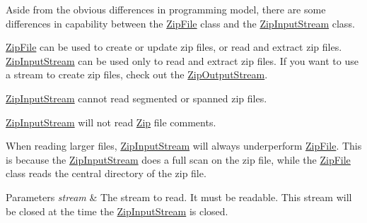 Aside from the obvious differences in programming model, there are some differences in capability between the {\ttfamily \mbox{\hyperlink{class_super_tiled2_unity_1_1_ionic_1_1_zip_1_1_zip_file}{Zip\+File}}} class and the {\ttfamily \mbox{\hyperlink{class_super_tiled2_unity_1_1_ionic_1_1_zip_1_1_zip_input_stream}{Zip\+Input\+Stream}}} class. 


\begin{DoxyItemize}
\item {\ttfamily \mbox{\hyperlink{class_super_tiled2_unity_1_1_ionic_1_1_zip_1_1_zip_file}{Zip\+File}}} can be used to create or update zip files, or read and extract zip files. {\ttfamily \mbox{\hyperlink{class_super_tiled2_unity_1_1_ionic_1_1_zip_1_1_zip_input_stream}{Zip\+Input\+Stream}}} can be used only to read and extract zip files. If you want to use a stream to create zip files, check out the \mbox{\hyperlink{class_super_tiled2_unity_1_1_ionic_1_1_zip_1_1_zip_output_stream}{Zip\+Output\+Stream}}. 


\item {\ttfamily \mbox{\hyperlink{class_super_tiled2_unity_1_1_ionic_1_1_zip_1_1_zip_input_stream}{Zip\+Input\+Stream}}} cannot read segmented or spanned zip files. 


\item {\ttfamily \mbox{\hyperlink{class_super_tiled2_unity_1_1_ionic_1_1_zip_1_1_zip_input_stream}{Zip\+Input\+Stream}}} will not read \mbox{\hyperlink{namespace_super_tiled2_unity_1_1_ionic_1_1_zip}{Zip}} file comments. 


\item When reading larger files, {\ttfamily \mbox{\hyperlink{class_super_tiled2_unity_1_1_ionic_1_1_zip_1_1_zip_input_stream}{Zip\+Input\+Stream}}} will always underperform {\ttfamily \mbox{\hyperlink{class_super_tiled2_unity_1_1_ionic_1_1_zip_1_1_zip_file}{Zip\+File}}}. This is because the {\ttfamily \mbox{\hyperlink{class_super_tiled2_unity_1_1_ionic_1_1_zip_1_1_zip_input_stream}{Zip\+Input\+Stream}}} does a full scan on the zip file, while the {\ttfamily \mbox{\hyperlink{class_super_tiled2_unity_1_1_ionic_1_1_zip_1_1_zip_file}{Zip\+File}}} class reads the central directory of the zip file. 


\end{DoxyItemize}


\begin{DoxyParams}{Parameters}
{\em stream} & The stream to read. It must be readable. This stream will be closed at the time the {\ttfamily \mbox{\hyperlink{class_super_tiled2_unity_1_1_ionic_1_1_zip_1_1_zip_input_stream}{Zip\+Input\+Stream}}} is closed. \\
\hline
\end{DoxyParams}


